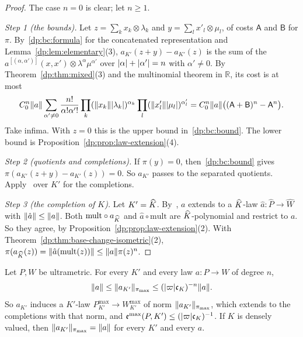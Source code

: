 \begin{proof}
The case $n=0$ is clear; let $n\ge1$.

\emph{Step 1 (the bounds).} Let $z=\sum_kx_k\otimes\lambda_k$ and $y=\sum_lx'_l\otimes\mu_l$, of costs $\mathsf A$ and $\mathsf B$ for $\pi$. By~\eqref{dp:bc:formula} for the concatenated representation and Lemma~\ref{dp:lem:elementary}(3), $a_{K'}(z+y)-a_{K'}(z)$ is the sum of the $a^{[(\alpha,\alpha')]}(x,x')\otimes\lambda^\alpha\mu^{\alpha'}$ over $\lvert \alpha\rvert+\lvert \alpha'\rvert=n$ with $\alpha'\ne0$. By Theorem~\ref{dp:thm:mixed}(3) and the multinomial theorem in $\mathbb R$, its cost is at most
\[
 C_0^n\lVert a\rVert\sum_{\alpha'\ne0}\frac{n!}{\alpha!\alpha'!}\prod_k(\lVert x_k\rVert\lvert \lambda_k\rvert)^{\alpha_k}\prod_l(\lVert x'_l\rVert\lvert \mu_l\rvert)^{\alpha'_l}=C_0^n\lVert a\rVert\bigl((\mathsf A+\mathsf B)^n-\mathsf A^n\bigr).
\]
Take infima. With $z=0$ this is the upper bound in~\eqref{dp:bc:bound}. The lower bound is Proposition~\ref{dp:prop:law-extension}(4).

\emph{Step 2 (quotients and completions).} If $\pi(y)=0$, then~\eqref{dp:bc:bound} gives $\pi(a_{K'}(z+y)-a_{K'}(z))=0$. So $a_{K'}$ passes to the separated quotients. Apply~\cite[Lemma~Q.13(1)]{I} over $K'$ for the completions.

\emph{Step 3 (the completion of $K$).} Let $K'=\widehat K$. By~\cite[Lemma~Q.13(1)]{I}, $a$ extends to a $\widehat K$-law $\hat a\colon\widehat P\to\widehat W$ with $\lVert \hat a\rVert\le\lVert a\rVert$. Both $\mathrm{mult}\circ a_{\widehat K}$ and $\hat a\circ\mathrm{mult}$ are $\widehat K$-polynomial and restrict to $a$. So they agree, by Proposition~\ref{dp:prop:law-extension}(2). With Theorem~\ref{dp:thm:base-change-isometric}(2), $\pi(a_{\widehat K}(z))=\lVert \hat a(\mathrm{mult}(z))\rVert\le\lVert a\rVert\pi(z)^n$.
\end{proof}

\begin{theorem}\label{dp:thm:base-change-um}
Let $P,W$ be ultrametric. For every $K'$ and every law $a\colon P\to W$ of degree $n$,
\[
 \lVert a\rVert\le\lVert a_{K'}\rVert_{\pi_{\max}}\le(\lvert \varpi\rvert\mathfrak c_K)^{-n}\lVert a\rVert.
\]
So $a_{K'}$ induces a $K'$-law $P^{\max}_{K'}\to W^{\max}_{K'}$ of norm $\lVert a_{K'}\rVert_{\pi_{\max}}$, which extends to the completions with that norm, and $\mathfrak e^{\max}(P,K')\le(\lvert \varpi\rvert\mathfrak c_K)^{-1}$. If $K$ is densely valued, then $\lVert a_{K'}\rVert_{\pi_{\max}}=\lVert a\rVert$ for every $K'$ and every $a$.
\end{theorem}

